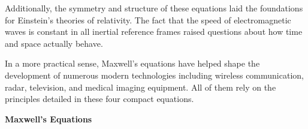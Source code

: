 \documentclass{article}
\begin{document}

\vspace{1em}
Additionally, the symmetry and structure of these equations laid the foundations for Einstein's theories of relativity. The fact that the speed of electromagnetic waves is constant in all inertial reference frames raised questions about how time and space actually behave.

\vspace{1em}
In a more practical sense, Maxwell's equations have helped shape the development of numerous modern technologies including wireless communication, radar, television, and medical imaging equipment. All of them rely on the principles detailed in these four compact equations.

\vspace{5em}

\begin{center}
\textbf{Maxwell's Equations}
\end{center}
\renewcommand{\arraystretch}{2.2}
\begin{center}
%
\end{center}
\end{document}
